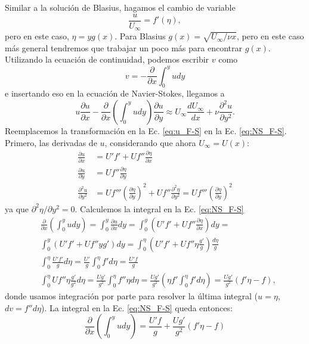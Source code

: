 Similar a la solución de Blasius, hagamos el cambio de variable
%
\begin{equation}\label{eq:u_F-S}
\frac{u}{U_\infty} = f'(\eta),
\end{equation}
%
pero en este caso, $\eta=yg(x)$.
Para Blasius $g(x)=\sqrt{U_\infty/\nu x}$, pero en este caso más general tendremos que trabajar un poco más para encontrar $g(x)$.
Utilizando la ecuación de continuidad, podemos escribir $v$ como
%
\begin{equation}\label{eq:v_F-S}
v = -\frac{\partial}{\partial x}\int_0^yudy
\end{equation}
%
e insertando eso en la ecuación de Navier-Stokes, llegamos a
%
\begin{equation}\label{eq:NS_F-S}
u\frac{\partial u}{\partial x} - \frac{\partial}{\partial x}\left(\int_0^yudy\right) \frac{\partial u}{\partial y} \approx U_\infty \frac{dU_\infty}{dx} + \nu \frac{\partial^2u}{\partial y^2}.
\end{equation}
%
Reemplacemos la transformación en la Ec. \eqref{eq:u_F-S} en la Ec. \eqref{eq:NS_F-S}.
Primero, las derivadas de $u$, considerando que ahora $U_\infty = U(x)$:
%
\begin{align}\label{eq:NS_F-S_der}
\frac{\partial u}{\partial x} &= U'f'+Uf''\frac{\partial \eta}{\partial x}\nonumber\\
\frac{\partial u}{\partial y} &= Uf''\frac{\partial\eta}{\partial y}\nonumber\\
\frac{\partial^2 u}{\partial y^2} &= Uf'''\left(\frac{\partial\eta}{\partial y}\right)^2 + Uf''\frac{\partial^2\eta}{\partial y^2} = Uf'''\left(\frac{\partial\eta}{\partial y}\right)^2
\end{align}
%
ya que $\partial^2\eta/\partial y^2=0$.
Calculemos la integral en la Ec. \eqref{eq:NS_F-S}
%
\begin{align}
&\frac{\partial}{\partial x}\left(\int_0^yudy\right) = \int_0^y\frac{\partial u}{\partial x}dy = \int_0^y \left(U'f'+Uf''\frac{\partial\eta}{\partial x}\right)dy = \nonumber\\
&\int_0^y \left(U'f'+Uf''yg'\right)dy = \int_0^\eta \left(U'f'+Uf''\eta\frac{g'}{g}\right)\frac{d\eta}{g} \nonumber\\
&\int_0^\eta \frac{U'f'}{g}d\eta = \frac{U'}{g}\int_0^\eta f'd\eta = \frac{U'f}{g}\nonumber\\
&\int_0^\eta Uf''\eta\frac{g'}{g^2}d\eta = \frac{Ug'}{g^2}\int_0^\eta f''\eta d\eta = \frac{Ug'}{g^2}\left(\eta f' \int_0^\eta f'd\eta\right) =\frac{Ug'}{g^2} \left(f'\eta - f\right),    
\end{align}
%
donde usamos integración por parte para resolver la última integral ($u=\eta$, $dv=f''d\eta$).
La integral en la Ec. \eqref{eq:NS_F-S} queda entonces:
%
\begin{equation}\label{eq:NS_F-S_int}
\frac{\partial}{\partial x}\left(\int_0^yudy\right) = \frac{U'f}{g} + \frac{Ug'}{g^2} \left(f'\eta - f\right) 
\end{equation}

